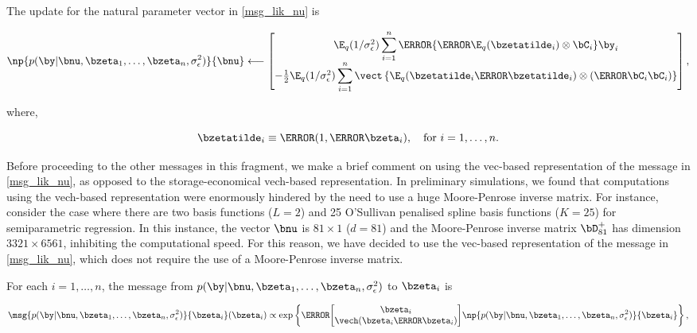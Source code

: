 \documentclass[12pt]{article}
\def\sigsqeps{\sigma^2_{\epsilon}}
\theoremstyle{plain}
\theoremstyle{definition}
\theoremstyle{remark}
\begin{document}
\noindent The update for the natural parameter vector in \eqref{msg_lik_nu} is

\begin{equation}
	\np{p (\by | \bnu, \bzeta_1, \dots, \bzeta_n, \sigsqeps)}{\bnu}
		\longleftarrow
			\begin{bmatrix}
				\E_q (1/\sigsqeps) \displaystyle\sum_{i=1}^n \T{\left\{
					\T{\E_q (\bzetatilde_i)} \otimes \bC_i
				\right\}} \by_i \\
				-\frac12 \E_q (1/\sigsqeps) \displaystyle\sum_{i=1}^n \vect \left\{
					\E_q (\bzetatilde_i \T{\bzetatilde_i}) \otimes (\T{\bC_i} \bC_i)
				\right\}
			\end{bmatrix},
\label{np_lik_nu}
\end{equation}

\noindent where, 

\begin{equation}
	\bzetatilde_i \equiv \T{(1, \T{\bzeta_i})}, \quad \text{for $i = 1, \dots, n$.}
\label{zeta_tilde}
\end{equation}

\noindent Before proceeding to the other messages in this fragment, we make a brief comment on using the vec-based
representation of the message in \eqref{msg_lik_nu}, as opposed to the storage-economical vech-based representation.
In preliminary simulations, we found that computations using the vech-based representation were enormously hindered
by the need to use a huge Moore-Penrose inverse matrix. For instance, consider the case where
there are two basis functions ($L = 2$) and 25 O'Sullivan penalised spline basis functions ($K = 25$) for semiparametric
regression. In this instance, the vector $\bnu$ is $81 \times 1$ ($d = 81$) and the Moore-Penrose inverse matrix
$\bD_{81}^+$ has dimension $3321 \times 6561$, inhibiting the computational speed. For this reason, we have
decided to use the vec-based representation of the message in \eqref{msg_lik_nu}, which does not require the
use of a Moore-Penrose inverse matrix.

For each $i = 1, \dots, n$, the message from $p (\by | \bnu, \bzeta_1, \dots, \bzeta_n, \sigsqeps)$ to $\bzeta_i$ is

\begin{equation}
	\msg{p (\by | \bnu, \bzeta_1, \dots, \bzeta_n, \sigsqeps)}{\bzeta_i} (\bzeta_i) \propto
		\exp \left\{
			\T{\begin{bmatrix}
				\bzeta_i \\
				\vech (\bzeta_i \T{\bzeta_i})
			\end{bmatrix}}
			\np{p (\by | \bnu, \bzeta_1, \dots, \bzeta_n, \sigsqeps)}{\bzeta_i}
		\right\},
\label{msg_lik_zeta}
\end{equation}
\end{document}

